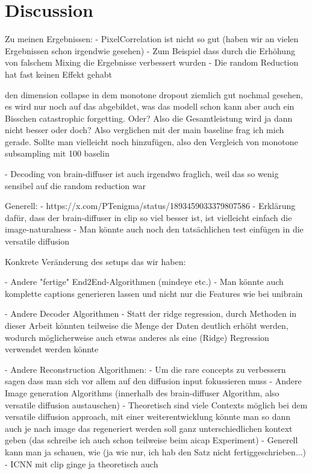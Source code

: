 \chapter{Discussion}


Zu meinen Ergebnissen:
- PixelCorrelation ist nicht so gut (haben wir an vielen Ergebnissen schon irgendwie gesehen)
    - Zum Beispiel dass durch die Erhöhung von falschem Mixing die Ergebnisse verbessert wurden
    - Die random Reduction hat fast keinen Effekt gehabt


den dimension collapse in dem monotone dropout ziemlich gut nochmal gesehen, es wird nur noch auf das abgebildet, was das modell schon kann
aber auch ein Bisschen catastrophic forgetting. 
Oder?
Also die Gesamtleistung wird ja dann nicht besser oder doch?
Also verglichen mit der main baseline frag ich mich gerade.
Sollte man vielleicht noch hinzufügen, also den Vergleich von monotone subsampling mit 100 baselin

- Decoding von brain-diffuser ist auch irgendwo fraglich, weil das so wenig sensibel auf die random reduction war

Generell:
- https://x.com/PTenigma/status/1893459033379807586
- Erklärung dafür, dass der brain-diffuser in clip so viel besser ist, ist vielleicht einfach die image-naturalness
- Man könnte auch noch den tatsächlichen test einfügen in die versatile diffusion

Konkrete Veränderung des setups das wir haben:

- Andere "fertige" End2End-Algorithmen (mindeye etc.)
    - Man könnte auch komplette captions generieren lassen und nicht nur die Features wie bei unibrain \cite{maiUniBrainUnifyImage2023}

- Andere Decoder Algorithmen 
    - Statt der ridge regression, durch Methoden in dieser Arbeit könnten teilweise die Menge der Daten deutlich erhöht werden, wodurch möglicherweise auch etwas anderes als eine (Ridge) Regression verwendet werden könnte

- Andere Reconstruction Algorithmen:
    - Um die rare concepts zu verbessern sagen \cite{samuelGeneratingImagesRare2024} dass man sich vor allem auf den diffusion input fokussieren muss
    - Andere Image generation Algorithms (innerhalb des brain-diffuser Algorithm, also versatile diffusion austauschen)
    - Theoretisch sind viele Contexts möglich bei dem versatile diffusion approach, mit einer weiterentwicklung könnte man so dann auch je nach image das regeneriert werden soll ganz unterschiedlichen kontext geben (das schreibe ich auch schon teilweise beim aicap Experiment)
    - Generell kann man ja schauen, wie (ja wie nur, ich hab den Satz nicht fertiggeschrieben...)
    - ICNN mit clip ginge ja theoretisch auch


